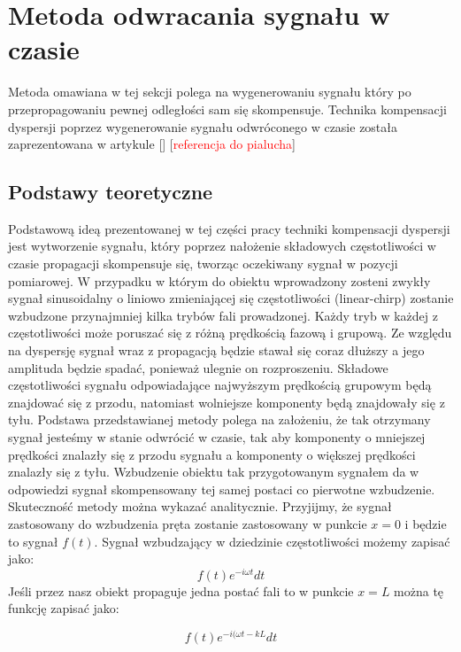 \section{Metoda odwracania sygnału w czasie}
\label{sec:metoda_tr}

Metoda omawiana w tej sekcji polega na wygenerowaniu sygnału który po przepropagowaniu pewnej odległości sam się skompensuje. Technika kompensacji dyspersji poprzez wygenerowanie sygnału odwróconego w czasie została zaprezentowana w artykule [] [\textcolor{red}{referencja do pialucha}]

\subsection{Podstawy teoretyczne}
Podstawową ideą prezentowanej w tej części pracy techniki kompensacji dyspersji jest wytworzenie sygnału, który poprzez nałożenie składowych częstotliwości w czasie propagacji skompensuje się, tworząc oczekiwany sygnał w pozycji pomiarowej. W przypadku w którym do obiektu wprowadzony zosteni zwykły sygnał sinusoidalny o liniowo zmieniającej się częstotliwości (linear-chirp) zostanie wzbudzone przynajmniej kilka trybów fali prowadzonej. Każdy tryb w każdej z częstotliwości może poruszać się z różną prędkością fazową i grupową. Ze względu na dyspersję sygnał wraz z propagacją będzie stawał się coraz dłuższy a jego amplituda będzie spadać, ponieważ ulegnie on rozproszeniu.  Składowe częstotliwości sygnału odpowiadające najwyższym prędkością grupowym będą znajdować się z przodu, natomiast wolniejsze komponenty będą znajdowały się z tyłu. Podstawa przedstawianej metody polega na założeniu, że tak otrzymany sygnał jesteśmy w stanie odwrócić w czasie, tak aby komponenty o mniejszej prędkości znalazły się z przodu sygnału a komponenty o większej prędkości znalazły się z tyłu. Wzbudzenie obiektu tak przygotowanym sygnałem da w odpowiedzi sygnał skompensowany tej samej postaci co pierwotne wzbudzenie. Skuteczność metody można wykazać analitycznie. Przyjijmy, że sygnał zastosowany do wzbudzenia pręta zostanie zastosowany w punkcie $x = 0$ i będzie to sygnał $f(t)$. Sygnał wzbudzający w dziedzinie częstotliwości możemy zapisać jako:
\begin{equation}
[F(\omega)_{x=0}=\int\limits_{-\int}^{\int}]f(t)e^{-i\omega t}dt \label{eq:F(omega)_x=0}
\end{equation}
Jeśli przez nasz obiekt propaguje jedna postać fali to w punkcie $x=L$ można tę funkcję zapisać jako:

\begin{equation}
[F(\omega)_{x=L}=\int\limits_{-\int}^{\int}]f(t)e^{-i(\omega t - kL}dt \label{eq:F(omega)_x=L}
\end{equation}

